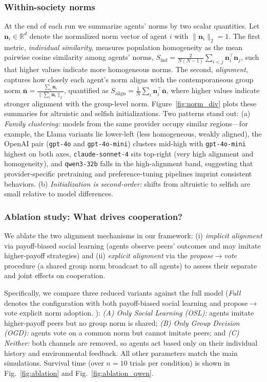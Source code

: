 \documentclass[sigconf]{aamas}
\newcommand{\figref}[1]{Fig.~\ref{#1}}
\begin{document}
\subsubsection{\textbf{Within-society norms}}
At the end of each run we summarize agents’ norms by two scalar quantities. 
Let $\mathbf{n}_i \in \mathbb{R}^d$ denote the normalized norm vector of agent $i$ with $\|\mathbf{n}_i\|_2 = 1$. 
The first metric, \emph{individual similarity}, measures population homogeneity as the mean pairwise cosine similarity among agents’ norms,
$S_{\text{ind}} = \tfrac{2}{N(N-1)} \sum_{i<j} \mathbf{n}_i^\top \mathbf{n}_j$, 
such that higher values indicate more homogeneous norms. 
The second, \emph{alignment}, captures how closely each agent’s norm aligns with the contemporaneous group norm 
$\bar{\mathbf{n}} = \tfrac{\sum_i \mathbf{n}_i}{\|\sum_i \mathbf{n}_i\|_2}$, 
quantified as $S_{\text{align}} = \tfrac{1}{N} \sum_i \mathbf{n}_i^\top \bar{\mathbf{n}}$, 
where higher values indicate stronger alignment with the group-level norm. 
Figure~\ref{fig:norm_div} plots these summaries for altruistic and selfish initializations. 
Two patterns stand out: (a) \textit{Family clustering:} models from the same provider occupy similar regions—for example, the Llama variants lie lower-left (less homogeneous, weakly aligned), 
the OpenAI pair (\texttt{gpt-4o} and \texttt{gpt-4o-mini}) clusters mid-high with \texttt{gpt-4o-mini} highest on both axes, 
\texttt{claude-sonnet-4} sits top-right (very high alignment and homogeneity), 
and \texttt{qwen3-32b} falls in the high-alignment band, suggesting that provider-specific pretraining and preference-tuning pipelines imprint consistent behaviors. 
(b) \textit{Initialization is second-order:} shifts from altruistic to selfish are small relative to model differences.

\subsubsection{\textbf{Ablation study: What drives cooperation?}} \label{sec:ablation}
We ablate the two alignment mechanisms in our framework: (i) \emph{implicit alignment} via payoff-biased social learning (agents observe peers’ outcomes and may imitate higher-payoff strategies) and (ii) \emph{explicit alignment} via the \emph{propose}$\to$\emph{vote} procedure (a shared group norm broadcast to all agents) to assess their separate and joint effects on cooperation.

Specifically, we compare three reduced variants against the full model (\emph{Full} denotes the configuration with both payoff-biased social learning and propose$\to$vote explicit norm adoption.
): 
\emph{(A) Only Social Learning (OSL):} agents imitate higher-payoff peers but no group norm is shared; 
\emph{(B) Only Group Decision (OGD):} agents vote on a common norm but cannot imitate peers; and 
\emph{(C) Neither:} both channels are removed, so agents act based only on their individual history and environmental feedback.
All other parameters match the main simulations. Survival time (over $n\!=\!10$ trials per condition) is shown in \figref{fig:ablation} and \figref{fig:ablation_qwen}.
\end{document}
